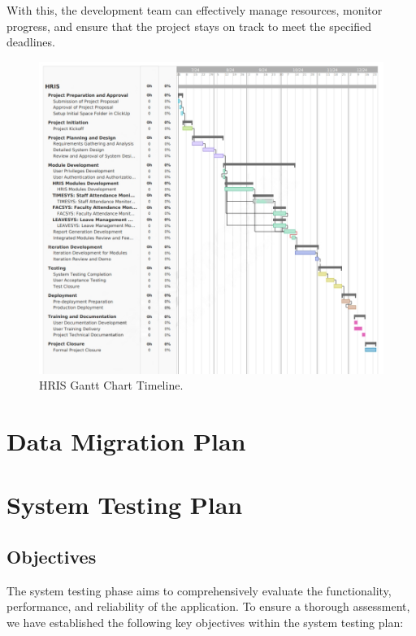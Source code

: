     With this, the development team can effectively manage resources, monitor progress, and ensure that the project stays on track to meet the specified deadlines.

    \begin{figure}[H]
        \centering
        \includegraphics[width=1\linewidth]{figures/images/gantt-chart.png}
        \caption{HRIS Gantt Chart Timeline.}
        \label{fig:gantt-chart}
    \end{figure}

\section{Data Migration Plan}

\section{System Testing Plan}

    \subsection{Objectives}

    The system testing phase aims to comprehensively evaluate the functionality, performance, and reliability of the application. To ensure a thorough assessment, we have established the following key objectives within the system testing plan:
    
